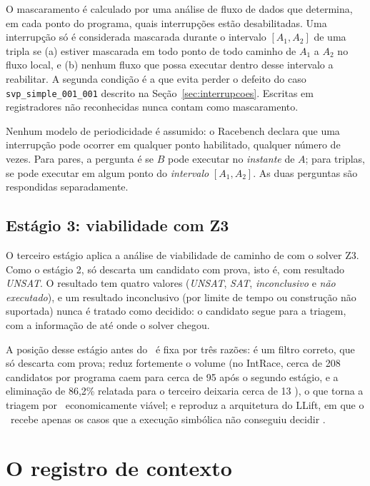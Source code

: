 O mascaramento é calculado por uma análise de fluxo de dados que determina, em
cada ponto do programa, quais interrupções estão desabilitadas. Uma interrupção
só é considerada mascarada durante o intervalo $[A_1, A_2]$ de uma tripla se
(a) estiver mascarada em todo ponto de todo caminho de $A_1$ a $A_2$ no fluxo
local, e (b) nenhum fluxo que possa executar dentro desse intervalo a reabilitar.
A segunda condição é a que evita perder o defeito do caso
\texttt{svp\_simple\_001\_001} descrito na Seção~\ref{sec:interrupcoes}. Escritas
em registradores não reconhecidas nunca contam como mascaramento.

Nenhum modelo de periodicidade é assumido: o Racebench declara que uma
interrupção pode ocorrer em qualquer ponto habilitado, qualquer número de
vezes. Para pares, a pergunta é se $B$ pode executar no \textit{instante} de
$A$; para triplas, se pode executar em algum ponto do \textit{intervalo}
$[A_1, A_2]$. As duas perguntas são respondidas separadamente.

\subsection{Estágio 3: viabilidade com Z3}

O terceiro estágio aplica a análise de viabilidade de caminho de
 com o solver Z3. Como o estágio 2, só descarta um candidato com prova, isto é, com resultado \textit{UNSAT}.
O resultado tem quatro valores (\textit{UNSAT}, \textit{SAT}, \textit{inconclusivo} e \textit{não executado}), e um resultado inconclusivo
(por limite de tempo ou construção não suportada) nunca é tratado como decidido:
o candidato segue para a triagem, com a informação de até onde o solver chegou.

A posição desse estágio antes do \llm\ é fixa por três razões: é um filtro correto, que só descarta com prova; reduz fortemente o volume (no IntRace, cerca de 208
candidatos por programa caem para cerca de 95 após o segundo estágio, e a
eliminação de 86,2\% relatada para o terceiro deixaria cerca de 13 \cite{intrace}), o que torna a triagem por \llm\ economicamente viável; e reproduz a arquitetura do LLift, em que o \llm\ recebe
apenas os casos que a execução simbólica não conseguiu decidir \cite{llift}.

\section{O registro de contexto}
\label{sec:registro}

